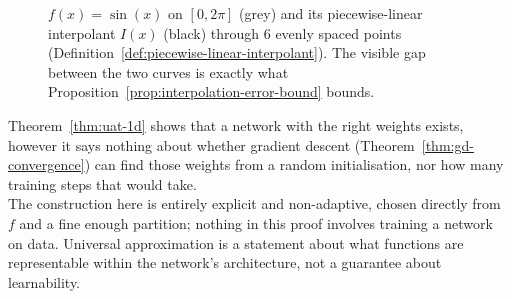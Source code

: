 		\begin{figure}[h]
			\centering
			\caption{$f(x)=\sin(x)$ on $[0,2\pi]$ (grey) and its piecewise-linear interpolant $I(x)$ (black) through $6$ evenly spaced points (Definition~\ref{def:piecewise-linear-interpolant}). The visible gap between the two curves is exactly what Proposition~\ref{prop:interpolation-error-bound} bounds.}
			\label{fig:uat}
		\end{figure}
		
		\begin{remark}[Representability]
			\label{rem:uat-representability-only}
			Theorem~\ref{thm:uat-1d} shows that a network with the right weights exists, however it says nothing about whether gradient descent (Theorem~\ref{thm:gd-convergence}) can find those weights from a random initialisation, nor how many training steps that would take. \\
			
			The construction here is entirely explicit and non-adaptive, chosen directly from $f$ and a fine enough partition; nothing in this proof involves training a network on data. Universal approximation is a statement about what functions are representable within the network's architecture, not a guarantee about learnability.
		\end{remark}
